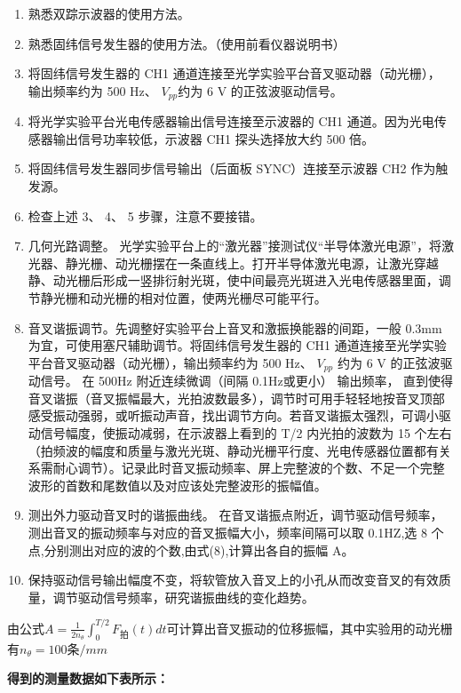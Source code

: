 \documentclass[dvipsnames, svgnames,a4paper,11pt]{article}
\begin{document}
	\begin{enumerate}
		\item 熟悉双踪示波器的使用方法。
		\item 熟悉固纬信号发生器的使用方法。（使用前看仪器说明书）
		\item 将固纬信号发生器的 CH1 通道连接至光学实验平台音叉驱动器（动光栅）， 输出频率约为 500 Hz、 $V_{pp} $约为 6 V 的正弦波驱动信号。
		\item 将光学实验平台光电传感器输出信号连接至示波器的 CH1 通道。因为光电传感器输出信号功率较低，示波器 CH1 探头选择放大约 500 倍。
		\item 将固纬信号发生器同步信号输出（后面板 SYNC）连接至示波器 CH2 作为触发源。
		\item 检查上述 3、 4、 5 步骤，注意不要接错。
		\item 几何光路调整。 光学实验平台上的“激光器”接测试仪“半导体激光电源”，将激光器、静光栅、动光栅摆在一条直线上。打开半导体激光电源，让激光穿越静、动光栅后形成一竖排衍射光斑，使中间最亮光斑进入光电传感器里面，调节静光栅和动光栅的相对位置，使两光栅尽可能平行。
		\item 音叉谐振调节。先调整好实验平台上音叉和激振换能器的间距，一般 0.3mm 为宜，可使用塞尺辅助调节。将固纬信号发生器的 CH1 通道连接至光学实验平台音叉驱动器（动光栅），输出频率约为 500 Hz、 $V_{pp} $ 约为 6 V 的正弦波驱动信号。 在 500Hz 附近连续微调（间隔 0.1Hz或更小） 输出频率， 直到使得音叉谐振（音叉振幅最大，光拍波数最多），调节时可用手轻轻地按音叉顶部感受振动强弱，或听振动声音，找出调节方向。若音叉谐振太强烈，可调小驱动信号幅度，使振动减弱，在示波器上看到的 T/2 内光拍的波数为 15 个左右（拍频波的幅度和质量与激光光斑、静动光栅平行度、光电传感器位置都有关系需耐心调节）。记录此时音叉振动频率、屏上完整波的个数、不足一个完整波形的首数和尾数值以及对应该处完整波形的振幅值。
		\item 测出外力驱动音叉时的谐振曲线。 在音叉谐振点附近，调节驱动信号频率，测出音叉的振动频率与对应的音叉振幅大小，频率间隔可以取 0.1HZ,选 8 个点,分别测出对应的波的个数,由式(8),计算出各自的振幅 A。
		\item 保持驱动信号输出幅度不变，将软管放入音叉上的小孔从而改变音叉的有效质量，调节驱动信号频率，研究谐振曲线的变化趋势。
	\end{enumerate}

	由公式$ A =\frac{1}{2n_\theta} \int_0^{T/2} F_{拍}(t)  dt $可计算出音叉振动的位移振幅，其中实验用的动光栅有$n_\theta=100条/mm$


	\textbf{得到的测量数据如下表所示：}
		
\end{document}
